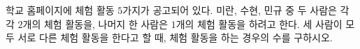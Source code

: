 \hspace*{2mm}\begin{minipage}[t]{\dimexpr\linewidth-2mm\relax}\vspace{0pt}
학교 홈페이지에 체험 활동 $5$가지가 공고되어 있다. 미란, 수현, 민규 중 두 사람은 각각 $2$개의 체험 활동을, 나머지 한 사람은 $1$개의 체험 활동을 하려고 한다. 세 사람이 모두 서로 다른 체험 활동을 한다고 할 때, 체험 활동을 하는 경우의 수를 구하시오.\end{minipage}
